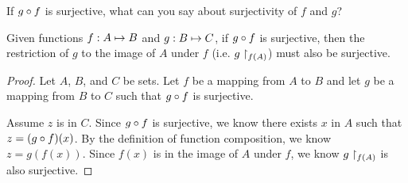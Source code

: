 \documentclass[main.tex]{subfiles}
\begin{document}
\subproblem{}\label{s2p4e}

If \({g} \circ{} {f}\) is surjective, what can you say about surjectivity of
\(f\) and \(g\)?

\begin{thm}
	Given functions \({f}: {A} \mapsto{} {B}\) and \({g}: {B} \mapsto{} {C}\), if
	\({g} \circ{} {f}\) is surjective, then the restriction of \(g\) to the
	image of \(A\) under \(f\) (i.e. \({g}\restriction_{f(A)}\)) must also be
	surjective.
\end{thm}
\begin{proof}
	Let \(A\), \(B\), and \(C\) be sets. Let \(f\) be a mapping from \(A\)
	to \(B\) and let \(g\) be a mapping from \(B\) to \(C\) such that
	\({g} \circ{} {f}\) is surjective.

	Assume \(z\) is in \(C\). Since \({g} \circ{} {f}\) is surjective, we
	know there exists \(x\) in \(A\) such that
	\(z = ({g} \circ{} {f})({x})\). By the definition of function
	composition, we know \(z = g(f(x))\). Since \(f(x)\) is in the image of
	\(A\) under \(f\), we know \({g}\restriction_{f(A)}\) is also surjective.
\end{proof}
\end{document}
